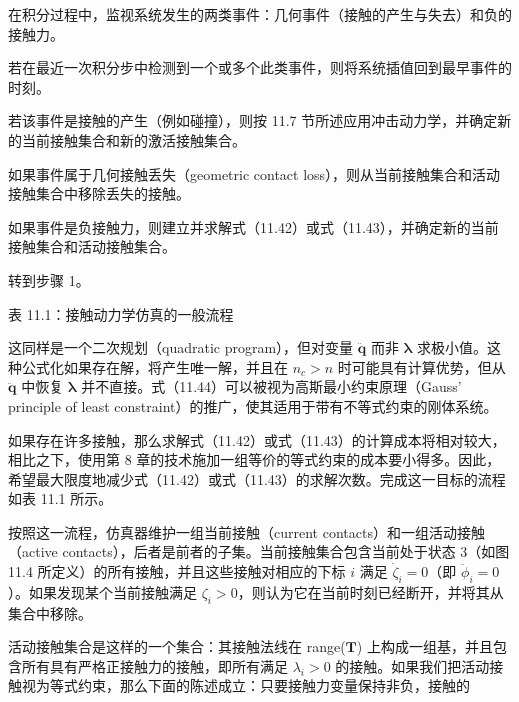 \documentclass[10pt,a4paper]{book}
\theoremstyle{thmstyle} %
\theoremstyle{defstyle} %
\theoremstyle{prostyle} %
\begin{document}
在积分过程中，监视系统发生的两类事件：几何事件（接触的产生与失去）和负的接触力。



若在最近一次积分步中检测到一个或多个此类事件，则将系统插值回到最早事件的时刻。



若该事件是接触的产生（例如碰撞），则按 11.7 节所述应用冲击动力学，并确定新的当前接触集合和新的激活接触集合。





如果事件属于几何接触丢失（geometric contact loss），则从当前接触集合和活动接触集合中移除丢失的接触。



如果事件是负接触力，则建立并求解式（11.42）或式（11.43），并确定新的当前接触集合和活动接触集合。



转到步骤 1。



表 11.1：接触动力学仿真的一般流程



这同样是一个二次规划（quadratic program），但对变量 $\ddot{\boldsymbol{q}}$ 而非 $\boldsymbol{\lambda}$ 求极小值。这种公式化如果存在解，将产生唯一解，并且在 $n_{c} > n$ 时可能具有计算优势，但从 $\ddot{\boldsymbol{q}}$ 中恢复 $\boldsymbol{\lambda}$ 并不直接。式（11.44）可以被视为高斯最小约束原理（Gauss' principle of least constraint）的推广，使其适用于带有不等式约束的刚体系统。



如果存在许多接触，那么求解式（11.42）或式（11.43）的计算成本将相对较大，相比之下，使用第 8 章的技术施加一组等价的等式约束的成本要小得多。因此，希望最大限度地减少式（11.42）或式（11.43）的求解次数。完成这一目标的流程如表 11.1 所示。



按照这一流程，仿真器维护一组当前接触（current contacts）和一组活动接触（active contacts），后者是前者的子集。当前接触集合包含当前处于状态 3（如图 11.4 所定义）的所有接触，并且这些接触对相应的下标 $i$ 满足 $\dot{\zeta}_{i}=0$（即 $\ddot{\phi}_{i}=0$）。如果发现某个当前接触满足 $\zeta_{i}>0$，则认为它在当前时刻已经断开，并将其从集合中移除。



活动接触集合是这样的一个集合：其接触法线在 range($\mathbf{T}$) 上构成一组基，并且包含所有具有严格正接触力的接触，即所有满足 $\lambda_{i} > 0$ 的接触。如果我们把活动接触视为等式约束，那么下面的陈述成立：只要接触力变量保持非负，接触的
\end{document}
